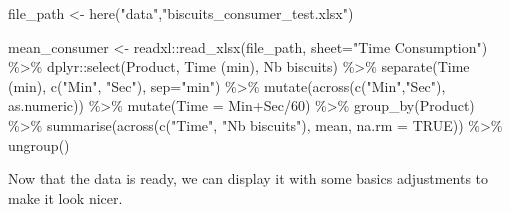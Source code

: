 \documentclass[
]{krantz}
\makeatletter
\newenvironment{Shaded}{\begin{snugshade}}{\end{snugshade}}
\newcommand{\AttributeTok}[1]{\textcolor[rgb]{0.61,0.61,0.61}{#1}}
\newcommand{\ConstantTok}[1]{\textcolor[rgb]{0,0,0}{#1}}
\newcommand{\DecValTok}[1]{\textcolor[rgb]{0.06,0.06,0.06}{#1}}
\newcommand{\FunctionTok}[1]{\textcolor[rgb]{0,0,0}{#1}}
\newcommand{\NormalTok}[1]{#1}
\newcommand{\OtherTok}[1]{\textcolor[rgb]{0.37,0.37,0.37}{#1}}
\newcommand{\SpecialCharTok}[1]{\textcolor[rgb]{0,0,0}{#1}}
\newcommand{\StringTok}[1]{\textcolor[rgb]{0.5,0.5,0.5}{#1}}
\newenvironment{kframe}{%
\medskip{}
\setlength{\fboxsep}{.8em}
 \def\at@end@of@kframe{}%
 \ifinner\ifhmode%
  \def\at@end@of@kframe{\end{minipage}}%
  \begin{minipage}{\columnwidth}%
 \fi\fi%
 \def\FrameCommand##1{\hskip\@totalleftmargin \hskip-\fboxsep
 \colorbox{shadecolor}{##1}\hskip-\fboxsep
     \hskip-\linewidth \hskip-\@totalleftmargin \hskip\columnwidth}%
 \MakeFramed {\advance\hsize-\width
   \@totalleftmargin\z@ \linewidth\hsize
   \@setminipage}}%
 {\par\unskip\endMakeFramed%
 \at@end@of@kframe}
\renewenvironment{Shaded}{\begin{kframe}}{\end{kframe}}
\makeatother
\begin{document}
\begin{Shaded}
\begin{Highlighting}[]
\NormalTok{file\_path }\OtherTok{\textless{}{-}} \FunctionTok{here}\NormalTok{(}\StringTok{"data"}\NormalTok{,}\StringTok{"biscuits\_consumer\_test.xlsx"}\NormalTok{) }

\NormalTok{mean\_consumer }\OtherTok{\textless{}{-}}\NormalTok{ readxl}\SpecialCharTok{::}\FunctionTok{read\_xlsx}\NormalTok{(file\_path, }
                                   \AttributeTok{sheet=}\StringTok{"Time Consumption"}\NormalTok{) }\SpecialCharTok{\%\textgreater{}\%}
\NormalTok{  dplyr}\SpecialCharTok{::}\FunctionTok{select}\NormalTok{(Product, }\StringTok{\textasciigrave{}}\AttributeTok{Time (min)}\StringTok{\textasciigrave{}}\NormalTok{, }\StringTok{\textasciigrave{}}\AttributeTok{Nb biscuits}\StringTok{\textasciigrave{}}\NormalTok{) }\SpecialCharTok{\%\textgreater{}\%}
  \FunctionTok{separate}\NormalTok{(}\StringTok{\textasciigrave{}}\AttributeTok{Time (min)}\StringTok{\textasciigrave{}}\NormalTok{, }\FunctionTok{c}\NormalTok{(}\StringTok{"Min"}\NormalTok{, }\StringTok{"Sec"}\NormalTok{), }\AttributeTok{sep=}\StringTok{"min"}\NormalTok{) }\SpecialCharTok{\%\textgreater{}\%}
  \FunctionTok{mutate}\NormalTok{(}\FunctionTok{across}\NormalTok{(}\FunctionTok{c}\NormalTok{(}\StringTok{"Min"}\NormalTok{,}\StringTok{"Sec"}\NormalTok{), as.numeric)) }\SpecialCharTok{\%\textgreater{}\%} 
  \FunctionTok{mutate}\NormalTok{(}\AttributeTok{Time =}\NormalTok{ Min}\SpecialCharTok{+}\NormalTok{Sec}\SpecialCharTok{/}\DecValTok{60}\NormalTok{) }\SpecialCharTok{\%\textgreater{}\%} 
  \FunctionTok{group\_by}\NormalTok{(Product) }\SpecialCharTok{\%\textgreater{}\%} 
  \FunctionTok{summarise}\NormalTok{(}\FunctionTok{across}\NormalTok{(}\FunctionTok{c}\NormalTok{(}\StringTok{"Time"}\NormalTok{, }\StringTok{"Nb biscuits"}\NormalTok{), mean, }\AttributeTok{na.rm =} \ConstantTok{TRUE}\NormalTok{)) }\SpecialCharTok{\%\textgreater{}\%} 
  \FunctionTok{ungroup}\NormalTok{()}
\end{Highlighting}
\end{Shaded}

Now that the data is ready, we can display it with some basics adjustments to make it look nicer.
\end{document}
